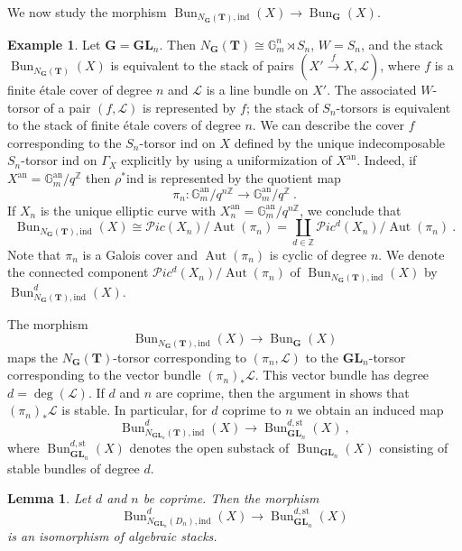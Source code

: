 \documentclass[10pt, a4paper]{amsart}
\newtheorem{lemma}[theorem]{Lemma}
\theoremstyle{definition}
\newtheorem{example}[theorem]{Example}
\theoremstyle{myitemstyle}
\newcommand{\Z}{\mathbb{Z}}
\newcommand{\G}{\mathbb{G}}
\newcommand{\bfG}{\mathbf{G}}
\newcommand{\bfT}{\mathbf{T}}
\newcommand{\bGL}{\mathbf{GL}}
\newcommand{\mc}[1]{{\mathcal{#1}}}
\DeclareMathOperator{\Aut}{Aut}
\DeclareMathOperator{\Bun}{Bun}
\newcommand{\mPic}{\mathcal Pic}
\newcommand{\an}{\mathrm{an}}
\newcommand{\st}{\mathrm{st}}
\newcommand{\ind}{\mathrm{ind}}
\begin{document}
We now study the morphism $\Bun_{N_\bfG(\bfT),\ind}(X)\to \Bun_\mathbf{G}(X)$.

\begin{example}
    Let $\mathbf{G}=\bGL_n$. Then $N_\bfG(\bfT)\cong \G_m^n \rtimes S_n$, $W=S_n$, and the stack $\Bun_{N_\bfG(\bfT)}(X)$ is equivalent to the stack of pairs $(X'\xrightarrow{f} X, \mc L)$, where $f$ is a finite étale cover of degree $n$ and $\mc L$ is a line bundle on $X'$. The associated $W$-torsor of a pair $(f,\mc L)$ is represented by $f$; the stack of $S_n$-torsors is equivalent to the stack of finite étale covers of degree $n$. We can describe the cover $f$ corresponding to the $S_n$-torsor $\ind$ on $X$ defined by the unique indecomposable $S_n$-torsor $\ind$ on $\Gamma_X$ explicitly by using a uniformization of $X^\an$. Indeed, if $X^\an=\G_m^\an/q^\Z$ then $\rho^*\ind$ is represented by the quotient map
    \[
    \pi_n\colon \G_m^\an/q^{n\Z}\longrightarrow \G_m^\an/q^\Z \ .
    \]
    If $X_n$ is the unique elliptic curve with $X_n^\an=\G_m^\an/q^{n\Z}$, we conclude that 
    \[
    \Bun_{N_{\mathbf{G}}(\bfT),\ind}(X) \cong \mPic(X_n)/\Aut(\pi_n) = \coprod_{d\in \Z} \mPic^d(X_n)/\Aut(\pi_n) \ .
    \]
    Note that $\pi_n$ is a Galois cover and $\Aut(\pi_n)$ is cyclic of degree $n$. We denote the connected component $\mPic^d(X_n)/\Aut(\pi_n)$ of $\Bun_{N_\bfG(\bfT),\ind}(X)$ by $\Bun_{N_\bfG(\bfT),\ind}^{d}(X)$.

    The morphism 
    \[
    \Bun_{N_\bfG(\bfT),\ind}(X)\longrightarrow \Bun_\mathbf{G}(X)
    \]
    maps the $N_\bfG(\bfT)$-torsor corresponding to $(\pi_n,\mc L)$ to the $\bGL_n$-torsor corresponding to the vector bundle $(\pi_n)_*\mc L$. This vector bundle has degree $d=\deg(\mc L)$. If $d$ and $n$ are coprime, then the argument in \cite[Appendix A]{Tu_semistablebundles} shows that $(\pi_n)_*\mc L$ is stable. In particular, for $d$ coprime to $n$ we obtain an induced map
    \[
        \Bun_{N_{\bGL_n}(\bfT),\ind}^{d}(X)\longrightarrow \Bun_{\bGL_n}^{d,\st}(X) \ ,
    \]
    where $\Bun_{\bGL_n}^{d,\st}(X)$ denotes the open substack of $\Bun_{\bGL_n}(X)$ consisting of stable bundles of degree $d$. 
\end{example}

\begin{lemma}
\label{lem:comparison of bun-spaces for GL_n}
    Let $d$ and $n$ be coprime. Then the morphism 
    \[
        \Bun_{N_{\bGL_n}(D_n),\ind}^{d}(X)\longrightarrow \Bun_{\bGL_n}^{d,\st}(X) 
    \]
    is an isomorphism of algebraic stacks.
\end{lemma}
\end{document}

